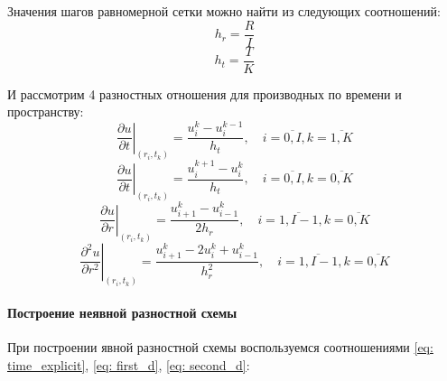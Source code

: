 \documentclass[a4paper,14pt,russian, leqno, fleqn]{extreport}
\begin{document}
	Значения шагов равномерной сетки можно найти из следующих соотношений:	
	\begin{equation}
	h_r = \dfrac{R}{I}
	\end{equation}	
	\begin{equation}
	h_t = \dfrac{T}{K}
	\end{equation}

	И рассмотрим 4 разностных отношения для производных по времени и пространству:	
	\begin{equation}
	\left.\dfrac{\partial u}{\partial t}\right|_{(r_i,t_k)} = \dfrac{u_i^k-u_i^{k-1}}{h_t}, \quad i = \overline{0, I}, k = \overline{1,K}
	\label{eq: time_implicit}
	\end{equation}	
	\begin{equation}
	\left.\dfrac{\partial u}{\partial t}\right|_{(r_i,t_k)} = \dfrac{u_i^{k+1}-u_i^k}{h_t}, \quad i = \overline{0, I}, k = \overline{0,K}
	\label{eq: time_explicit}
	\end{equation}	
	\begin{equation}
	\left.\dfrac{\partial u}{\partial r}\right|_{(r_i, t_k)} = \dfrac{u_{i+1}^k - u_{i-1}^k}{2h_r}, \quad i = \overline{1,I-1}, k = \overline{0,K}
	\label{eq: first_d}
	\end{equation}	
	\begin{equation}
	\left.\dfrac{\partial^2 u}{\partial r^2}\right|_{(r_i, t_k)} = \dfrac{u_{i+1}^k - 2u_i^k + u_{i-1}^k}{h^2_r}, \quad i = \overline{1,I-1}, k = \overline{0,K}
	\label{eq: second_d}
	\end{equation}
	
	\paragraph{Построение неявной разностной схемы}
	
	При построении явной разностной схемы воспользуемся соотношениями \eqref{eq: time_explicit}, \eqref{eq: first_d}, \eqref{eq: second_d}:
	
\end{document}
